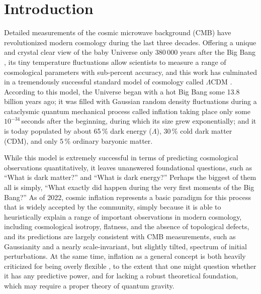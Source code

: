 \documentclass[twocolumn]{aa}
\begin{document}

\maketitle

\tableofcontents

\section{Introduction}
\label{sec:introduction}

Detailed measurements of the cosmic microwave background (CMB) have
revolutionized modern cosmology during the last three
decades. Offering a unique and crystal clear view of the baby Universe
only 380\,000 years after the Big Bang
\citep[e.g.,][]{bennett2012,planck2016-l01}, its tiny temperature
fluctuations allow scientists to measure a range of cosmological
parameters with sub-percent accuracy, and this work has culminated in
a tremendously successful standard model of cosmology called
$\Lambda$CDM \citep[e.g.,][]{hinshaw2012,planck2016-l06}. According to this
model, the Universe began with a hot Big Bang some 13.8\,billion
years ago; it was filled with Gaussian random density fluctuations
during a cataclysmic quantum mechanical process called inflation
taking place only some $10^{-34}$\,seconds after the beginning, during
which its size grew exponentially; and it is today populated by about
65\,\% dark energy ($\Lambda$), 30\,\% cold dark matter (CDM), and
only 5\,\% ordinary baryonic matter.

While this model is extremely successful in terms of predicting
cosmological observations quantitatively, it leaves unanswered foundational questions, such as ``What is dark matter?''
and ``What is dark energy?'' Perhaps the biggest of them all is
simply, ``What exactly did happen during the very first moments of the Big Bang?'' As of 2022, cosmic
inflation \citep[e.g.,][]{kamionkowski:2016} represents a basic
paradigm for this process that is widely accepted by the community,
simply because it is able to heuristically explain a range of
important observations in modern cosmology, including cosmological
isotropy, flatness, and the absence of topological defects, and its
predictions are largely consistent with CMB measurements, such as
Gaussianity and a nearly scale-invariant, but slightly tilted,
spectrum of initial perturbations. At the same time, inflation as a
general concept is both heavily criticized for being overly flexible
\citep[e.g.,][]{penrose:1989,ijjas:2014}, to the extent that one might
question whether it has any predictive power, and for lacking a robust
theoretical foundation, which may require a proper theory of quantum
gravity.
\end{document}
